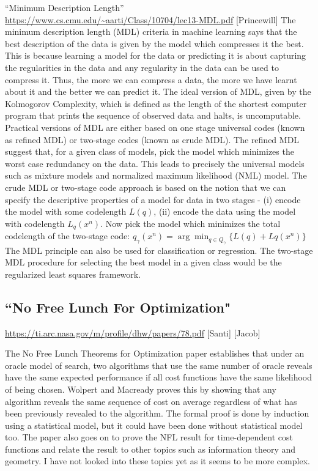 \documentclass[12pt]{article}
\begin{document}
``Minimum Description Length” \url{https://www.cs.cmu.edu/~aarti/Class/10704/lec13-MDL.pdf} [Princewill]
The minimum description length (MDL) criteria in machine learning says that the best description of the data is given by the model which compresses it the best. This is because learning a model for the data or predicting it is about capturing the regularities in the data and any regularity in the data can be used to compress it. Thus, the more we can compress a data, the more we have learnt about it and the better we can predict it. The ideal version of MDL, given by the Kolmogorov Complexity, which is defined as the length of the shortest computer program that prints the sequence of observed data and halts, is uncomputable.
Practical versions of MDL are either based on one stage universal codes (known as refined MDL) or two-stage codes (known as crude MDL). The refined MDL suggest that, for a given class of models, pick the model which minimizes the worst case redundancy on the data. This leads to precisely the universal models such as mixture models and normalized maximum likelihood (NML) model. The crude MDL or two-stage code approach is based on the notion that we can specify the descriptive properties of a model for data in two stages - (i) encode the model with some codelength $L(q)$, (ii) encode the data using the model with codelength $L_q(x^n)$. Now pick the model which minimizes the total codelength of the two-stage code: $q_\gamma(x^n) = \arg \min_{q\in Q_\gamma} \{L(q) + Lq(x^n)\}$
The MDL principle can also be used for classification or regression. The two-stage MDL procedure for selecting the best model in a given class would be the regularized least squares framework.

\newpage

\subsection*{“No Free Lunch For Optimization"}
\url{https://ti.arc.nasa.gov/m/profile/dhw/papers/78.pdf} [Santi] [Jacob]	

The No Free Lunch Theorems for Optimization paper establishes that under an oracle model of search, two algorithms that use the same number of oracle reveals have the same expected performance if all cost functions have the same likelihood of being chosen. Wolpert and Macready proves this by showing that any algorithm reveals the same sequence of cost on average regardless of what has been previously revealed to the algorithm. The formal proof is done by induction using a statistical model, but it could have been done without statistical model too. The paper also goes on to prove the NFL result for time-dependent cost functions and relate the result to other topics such as information theory and geometry. I have not looked into these topics yet as it seems to be more complex.
\end{document}
